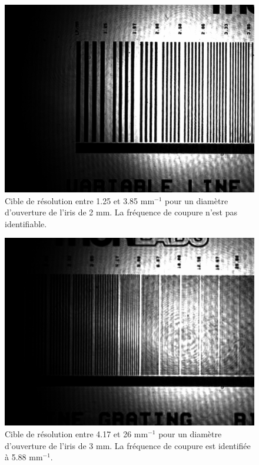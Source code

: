 \documentclass[11pt,letterpaper]{article}
\begin{document}
\begin{figure}[H]
  \centering
  \includegraphics[scale=0.28]{cible_d4_1-7.png}
  \caption{Cible de résolution entre 1.25 et 3.85 mm$^{-1}$ pour un diamètre d'ouverture de l'iris de 2 mm. La fréquence de coupure n'est pas identifiable.}
  \label{cible4-1-7}
\end{figure}

\begin{figure}[H]
  \centering
  \includegraphics[scale=0.28]{cible_d3_8-14.png}
  \caption{Cible de résolution entre 4.17 et 26 mm$^{-1}$ pour un diamètre d'ouverture de l'iris de 3 mm. La fréquence de coupure est identifiée à 5.88 mm$^{-1}$.}
  \label{cible3}
\end{figure}
\end{document}
